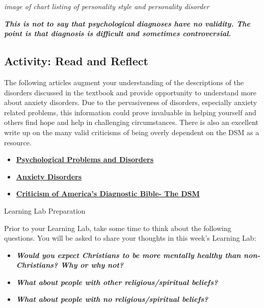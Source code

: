 \documentclass[
]{book}
\providecommand{\tightlist}{%
  \setlength{\itemsep}{0pt}\setlength{\parskip}{0pt}}
\begin{document}
\emph{image of chart listing of personality style and personality disorder}

\textbf{\emph{This is not to say that psychological diagnoses have no validity. The point is that diagnosis is difficult and sometimes controversial.}}

\hypertarget{activity-read-and-reflect-15}{%
\subsection*{Activity: Read and Reflect}\label{activity-read-and-reflect-15}}

\begin{reflect}
The following articles augment your understanding of the descriptions of the disorders discussed in the textbook and provide opportunity to understand more about anxiety disorders. Due to the pervasiveness of disorders, especially anxiety related problems, this information could prove invaluable in helping yourself and others find hope and help in challenging circumstances. There is also an excellent write up on the many valid criticisms of being overly dependent on the DSM as a resource.

\begin{itemize}
\tightlist
\item
  \href{http://www.psychologyinfo.com/problems/}{\textbf{Psychological Problems and Disorders}}\\
\item
  \href{http://www.psychologyinfo.com/problems/anxiety.html}{\textbf{Anxiety Disorders}}\\
\item
  \href{http://www.oregoncounseling.org/Diagnosis/CriticismOfDSM.htm}{\textbf{Criticism of America's Diagnostic Bible- The DSM}}
\end{itemize}

{Learning Lab Preparation}

Prior to your Learning Lab, take some time to think about the following questions. You will be asked to share your thoughts in this week's Learning Lab:

\begin{itemize}
\tightlist
\item
  \textbf{\emph{Would you expect Christians to be more mentally healthy than non-Christians? Why or why not?}}\\
\item
  \textbf{\emph{What about people with other religious/spiritual beliefs?}}\\
\item
  \textbf{\emph{What about people with no religious/spiritual beliefs?}}
\end{itemize}
\end{reflect}
\end{document}
